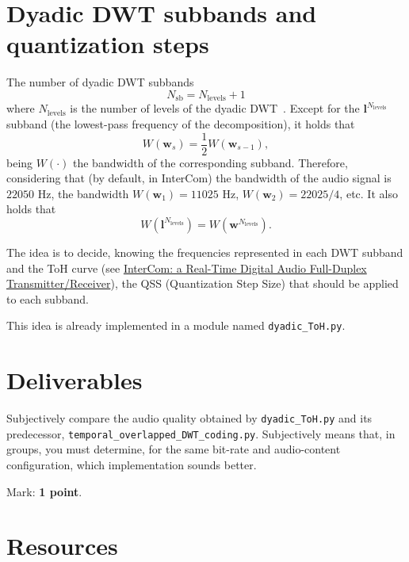 \section{Dyadic DWT subbands and quantization steps}
The number of dyadic DWT subbands
\begin{equation}
  N_{\text{sb}} = N_{\text{levels}} + 1
\end{equation}
where $N_{\text{levels}}$ is the number of levels of the
dyadic DWT~\cite{vetterli1995wavelets}. Except for the
${\mathbf l}^{N_{\text{levels}}}$ subband (the lowest-pass frequency
of the decomposition), it holds that
\begin{equation}
  W({\mathbf w}_s) = \frac{1}{2}W({\mathbf w}_{s-1}),
\end{equation}
being $W(\cdot)$ the bandwidth of the corresponding
subband. Therefore, considering that (by default, in InterCom) the
bandwidth of the audio signal is $22050$ Hz, the bandwidth
$W({\mathbf w}_1)=11025$ Hz, $W({\mathbf w}_2)=22025/4$, etc. It also
holds that
\begin{equation}
  W({\mathbf l}^{N_{\text{levels}}}) = W({\mathbf w}^{N_{\text{levels}}}).
\end{equation}

The idea is to decide, knowing the frequencies represented in each DWT
subband and the ToH curve (see
\href{https://github.com/Tecnologias-multimedia/InterCom/blob/master/docs/2-hours_seminar.ipynb}{
  InterCom: a Real-Time Digital Audio Full-Duplex
  Transmitter/Receiver}), the QSS (Quantization Step Size) that should
be applied to each subband.

This idea is already implemented in a module named \verb|dyadic_ToH.py|.

\section{Deliverables}

Subjectively compare the audio quality obtained by
\verb|dyadic_ToH.py| and its predecessor,
\verb|temporal_overlapped_DWT_coding.py|. Subjectively means that, in
groups, you must determine, for the same bit-rate and audio-content
configuration, which implementation sounds better.

Mark: \textbf{1 point}.

\section{Resources}




